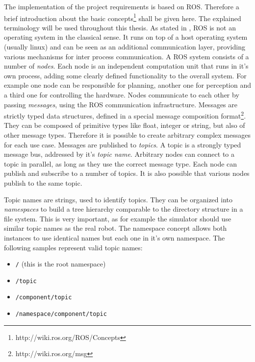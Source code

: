 The implementation of the project requirements is based on ROS. Therefore a brief introduction about the basic concepts\footnote{http://wiki.ros.org/ROS/Concepts} shall be given here. The explained terminology will be used throughout this thesis. As stated in \cite{quigley2009}, ROS is not an operating system in the classical sense. It runs on top of a host operating system (usually linux) and can be seen as an additional communication layer, providing various mechanisms for inter process communication. A ROS system consists of a number of \emph{nodes}. Each node is an independent computation unit that runs in it's own process, adding some clearly defined functionality to the overall system. For example one node can be responsible for planning, another one for perception and a third one for controlling the hardware. Nodes communicate to each other by passing \emph{messages}, using the ROS communication infrastructure. Messages are strictly typed data structures, defined in a special message composition format\footnote{http://wiki.ros.org/msg}. They can be composed of primitive types like float, integer or string, but also of other message types. Therefore it is possible to create arbitrary complex messages for each use case. Messages are published to \emph{topics}. A topic is a strongly typed message bus, addressed by it's \emph{topic name}. Arbitrary nodes can connect to a topic in parallel, as long as they use the correct message type. Each node can publish and subscribe to a number of topics. It is also possible that various nodes publish to the same topic. 

Topic names are strings, used to identify topics. They can be organized into \emph{namespaces} to build a tree hierarchy comparable to the directory structure in a file system. This is very important, as for example the simulator should use similar topic names as the real robot. The namespace concept allows both instances to use identical names but each one in it's own namespace. The following samples represent valid topic names:
\begin{itemize}
\item \texttt{/} (this is the root namespace)
\item \texttt{/topic}
\item \texttt{/component/topic}
\item \texttt{/namespace/component/topic}
\end{itemize}

